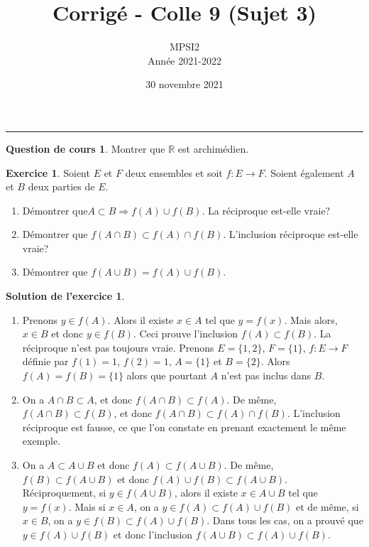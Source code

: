 \documentclass[a4paper, 11pt,openany]{article}%
\title{Corrigé - Colle 9 (Sujet 3)}
\author{MPSI2\\
Année 2021-2022}
\date{30 novembre 2021}
\theoremstyle{plain}
\theoremstyle{definition}
\newtheorem{cours}{Question de cours}
\newtheorem{exo}{Exercice}
\newtheorem{sol}{Solution de l'exercice}
\theoremstyle{remark}
\newcommand{\R}{\mathbb{R}}
\begin{document}
   \maketitle
      \rule{\linewidth}{0.5mm}

\begin{cours}
Montrer que $\R$ est archimédien.
\end{cours}


\begin{exo}
Soient $E$ et $F$ deux ensembles et soit $f:E \to F$. Soient également $A$ et $B$ deux parties de $E$.
\begin{enumerate}
\item Démontrer que$ A \subset B \Rightarrow f(A) \cup f(B)$. La réciproque est-elle vraie?
\item Démontrer que $f(A \cap B) \subset f(A) \cap f(B)$. L'inclusion réciproque est-elle vraie?
\item Démontrer que $f(A \cup B)=f(A) \cup f(B)$.
\end{enumerate}
\end{exo}

\begin{sol}
\begin{enumerate}
\item  Prenons $y \in f(A)$. Alors il existe $x \in A$ tel que $y=f(x)$. Mais alors, $x \in B$ et donc $y \in f(B)$. Ceci prouve l'inclusion $f(A) \subset f(B)$. La réciproque n'est pas toujours vraie. Prenons $E=\{1,2\}$, $F=\{1\}$, $f:E \to F$ définie par $f(1)=1$, $f(2)=1$, $A=\{1\}$ et $B=\{2\}$. Alors $f(A)=f(B)=\{1\}$ alors que pourtant $A$ n'est pas inclus dans $B$.
\item On a $A \cap B \subset A$, et donc $f(A\cap B) \subset f(A)$. De même, $f(A \cap B) \subset f(B)$, et donc $f(A \cap B) \subset f(A) \cap f(B)$. L'inclusion réciproque est fausse, ce que l'on constate en prenant exactement le même exemple.
\item On a $A \subset A \cup B$ et donc $f(A) \subset f(A \cup B)$. De même, $f(B)\subset f(A \cup B)$ et donc $f(A)\cup f(B)\subset f(A\cup B)$.\\
Réciproquement, si $y \in f(A \cup B)$, alors il existe $x \in A \cup B$ tel que $y=f(x)$. Mais si $x \in A$, on a $y \in f(A) \subset f(A) \cup f(B)$ et de même, si $x \in B$, on a $y \in f(B) \subset f(A) \cup f(B)$. Dans tous les cas, on a prouvé que $y \in f(A)\cup f(B)$ et donc l'inclusion $f(A \cup B) \subset f(A) \cup f(B)$. 
\end{enumerate}
\end{sol}
\end{document}
